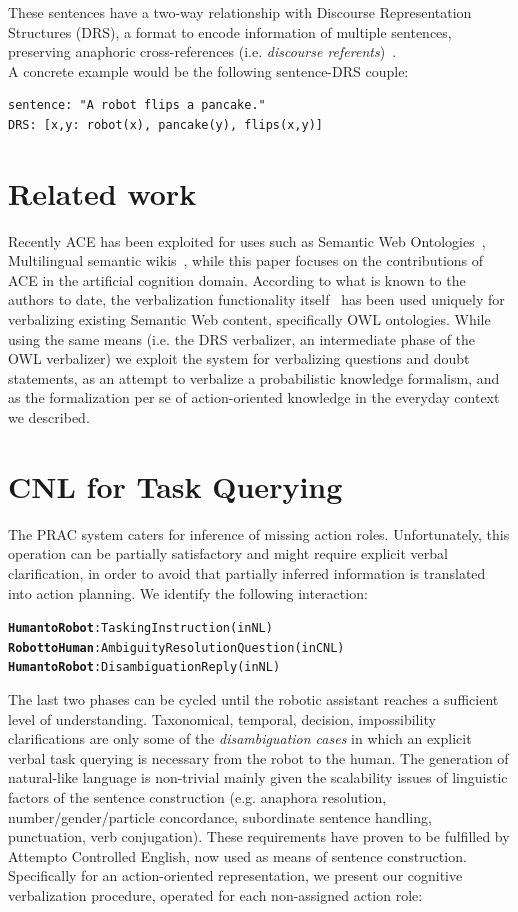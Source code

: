 \documentclass[oribibl]{llncs}
\begin{document}
These sentences have a two-way relationship with Discourse Representation 
Structures (DRS), a format to encode information of multiple sentences, 
preserving anaphoric cross-references (i.e. \textit{discourse referents})~\cite{kamp1993discourse}.\\
A concrete example would be the following sentence-DRS couple: 
\begin{verbatim}
sentence: "A robot flips a pancake."
DRS: [x,y: robot(x), pancake(y), flips(x,y)]
\end{verbatim}

\section{Related work} Recently ACE has been exploited for uses such 
as Semantic Web Ontologies~\cite{decoi2009rewerse}, Multilingual 
semantic wikis~\cite{kuhnkaljurandsemantic}, while this paper 
focuses on the contributions of ACE in the artificial cognition 
domain. According to what is known to the authors to date, the 
verbalization functionality itself~\cite{kaljurand:phd} has been 
used uniquely for verbalizing existing Semantic Web content, 
specifically OWL ontologies. While using the same means (i.e. the 
DRS verbalizer, an intermediate phase of the OWL verbalizer) we 
exploit the system for verbalizing questions and doubt statements, 
as an attempt to verbalize a probabilistic knowledge formalism, and 
as the formalization per se of action-oriented knowledge in the 
everyday context we described.

\section{CNL for Task Querying}
The PRAC system caters for inference of missing action roles. 
Unfortunately, this operation can be partially satisfactory and 
might require explicit verbal clarification, in order to avoid 
that partially inferred information is translated into action planning.
We identify the following interaction:
{\small
\begin{alltt}
\textbf{\color{Red}Human to Robot} : Tasking Instruction            (in NL)
\textbf{\color{Blue}Robot to Human} : Ambiguity Resolution Question (in CNL)
\textbf{\color{Red}Human to Robot} : Disambiguation Reply           (in NL)
\end{alltt}
}
The last two phases can be cycled until the robotic assistant reaches a sufficient level of understanding. 
Taxonomical, temporal, decision, impossibility clarifications are only some of the \textit{disambiguation cases} in which an explicit verbal task querying is necessary from the robot to the human. 
The generation of natural-like language is non-trivial mainly given the scalability issues of linguistic factors of the sentence construction (e.g. anaphora resolution, number/gender/particle concordance, subordinate sentence handling, punctuation, verb conjugation). These requirements have proven to be fulfilled by Attempto Controlled English, now used as means of sentence construction.\\
Specifically for an action-oriented representation, we present our cognitive verbalization procedure, operated for each non-assigned action role:
\end{document}
